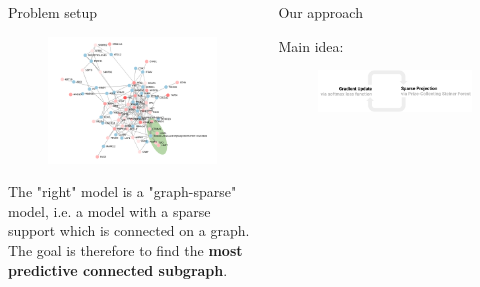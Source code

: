 \documentclass[svgnames,final]{beamer}
\begin{document}
\begin{frame}
\begin{columns}[T]
\begin{column}{.3\linewidth}
\begin{block}{Problem setup}
		\begin{figure}[h]
		\centering
		\includegraphics[width=\linewidth]{images/graph.pdf}
		\end{figure}

		The "right" model is a "graph-sparse" model, i.e. a model with a sparse support which is connected on a graph.
		The goal is therefore to find the \textbf{most predictive connected subgraph}.

	\end{block}

	\vspace{2cm}

\end{column}

\begin{column}{.3\linewidth}

	\begin{block}{Our approach}

		Main idea:

		\begin{figure}[h]
		\centering
		\includegraphics[width=\linewidth]{images/algo.pdf}
		\label{fig:test}
		\end{figure}


\end{block}
\end{column}
\end{columns}
\end{frame}
\end{document}
